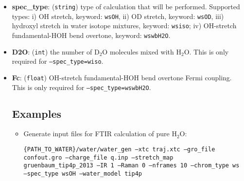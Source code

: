 \documentclass{article}
\begin{document}
\begin{itemize}
\item \textbf{spec\_type}: (\texttt{string}) type of calculation that will be performed. Supported types: i) OH stretch, keyword: \texttt{wsOH},
ii) OD stretch, keyword: \texttt{wsOD}, iii) hydroxyl stretch in water isotope mixtures, keyword: \texttt{wsiso}; iv) OH-stretch fundamental-HOH bend overtone,
keyword: \texttt{wswbH2O}.

\item \textbf{D2O}: (\texttt{int}) the number of D$_2$O molecules mixed with H$_2$O. This is only required for \texttt{--spec\_type=wiso}.

\item \textbf{Fc}: (\texttt{float}) OH-stretch fundamental-HOH bend overtone Fermi coupling. This is only required for \texttt{--spec\_type=wswbH2O}.

\subsection{Examples}
\begin{itemize}

\item Generate input files for FTIR calculation of pure H$_2$O:

\texttt{\{PATH\_TO\_WATER\}/water/water\_gen --xtc traj.xtc  --gro\_file confout.gro --charge\_file q.inp --stretch\_map gruenbaum\_tip4p\_2013  --IR 1 --Raman 0 --nframes 10 --chrom\_type ws  --spec\_type wsOH  --water\_model tip4p}

\end{itemize}

 

\end{itemize}
\end{document}
